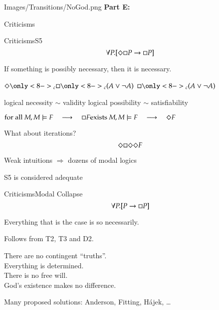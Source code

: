 \begin{transitionframe}{Images/Transitions/NoGod.png}
\textbf{Part E:}

Criticisms
\end{transitionframe}

\begin{frame}{Criticisms}{S5} \centering
$$
\forall P.[ \Diamond \Box P \rightarrow \Box P ] 
$$

\medskip

If something is possibly necessary, then it is necessary.

\pause

\bigskip


$
\pos\only<8->{_c} \nec\only<8->{_c} (A \vee \neg A)
$
\pause
\qquad 
$
\nec\only<8->{_c} (A \vee \neg A)
$

\pause

\bigskip

logical necessity $\sim$ validity
\hfill
logical possibility $\sim$ satisfiability

\pause 

\medskip

$ 
\textrm{for all } M, M \models F 
\quad \longrightarrow \quad
\nec F
\hfill
\textrm{exists } M, M \models F 
\quad \longrightarrow \quad
\pos F
$

\pause

\bigskip

What about iterations?
$$
\Diamond \Box \Diamond \Diamond F
$$

\medskip

\pause

Weak intuitions $\Rightarrow$ dozens of modal logics

\medskip

\pause

\alert{S5 is considered adequate}


\end{frame}


\begin{frame}{Criticisms}{Modal Collapse} \centering
$$
\forall P.[ P \rightarrow \Box P ] 
$$

\medskip

Everything that is the case is so necessarily.

\pause

\medskip

Follows from T2, T3 and D2.

\pause

\medskip

There are no contingent ``truths''. \\ \pause
Everything is determined. \\ \pause
There is no free will. \\ \pause
God's existence makes no difference.

\pause
\bigskip

Many proposed solutions: Anderson, Fitting, H\'ajek, \ldots
 
\end{frame}


